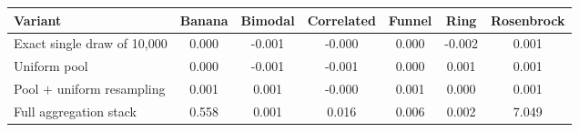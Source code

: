 \begin{tabular}{lcccccc}
\toprule
Variant & Banana & Bimodal & Correlated & Funnel & Ring & Rosenbrock \\
\midrule
Exact single draw of 10{,}000 & 0.000 & -0.001 & -0.000 & 0.000 & -0.002 & 0.001 \\
Uniform pool & 0.000 & -0.001 & -0.001 & 0.000 & 0.001 & 0.001 \\
Pool $+$ uniform resampling & 0.001 & 0.001 & -0.000 & 0.001 & 0.000 & 0.001 \\
Full aggregation stack & 0.558 & 0.001 & 0.016 & 0.006 & 0.002 & 7.049 \\
\bottomrule
\end{tabular}

